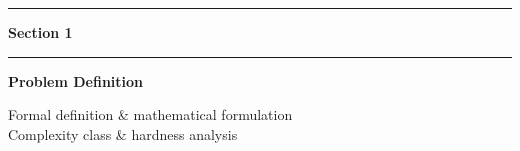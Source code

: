 \documentclass[aspectratio=169,10pt]{beamer}
\begin{document}

{
\begin{frame}[plain]

  \begin{center}
    {\color{goldaccent}\rule{0.15\textwidth}{2pt}}
    \hspace{0.5em}
    {\color{white}\large\textbf{Section 1}}
    \hspace{0.5em}
    {\color{goldaccent}\rule{0.15\textwidth}{2pt}}

    \vspace{0.6cm}
    {\color{white}\Huge\textbf{Problem Definition}}

    \vspace{0.4cm}
    {\color{iceblue}\normalsize Formal definition \& mathematical formulation}\\[6pt]
    {\color{iceblue}\normalsize Complexity class \& hardness analysis}
  \end{center}
\end{frame}
}
\end{document}

